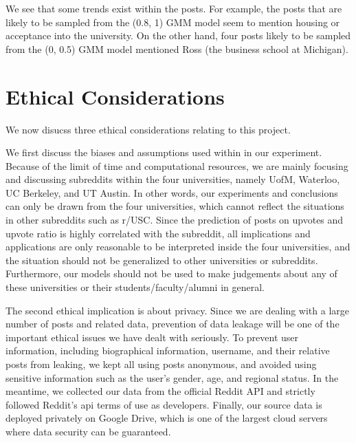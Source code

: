 \documentclass[11pt,a4paper]{article}
\let\Oldsection\section
\renewcommand{\section}{\FloatBarrier\Oldsection}
\begin{document}
    We see that some trends exist within the posts. For example, the posts that are likely to be sampled from the (0.8, 1) GMM model seem to mention housing or acceptance into the university. On the other hand, four posts likely to be sampled from the (0, 0.5) GMM model mentioned Ross (the business school at Michigan).
    
    
\Oldsection{Ethical Considerations}
\label{sec:ethics}
    We now disucss three ethical considerations relating to this project.

    We first discuss the biases and assumptions used within in our experiment. Because of the limit of time and computational resources, we are mainly focusing and discussing subreddits within the four universities, namely UofM, Waterloo, UC Berkeley, and UT Austin. In other words, our experiments and conclusions can only be drawn from the four universities, which cannot reflect the situations in other subreddits such as r/USC. Since the prediction of posts on upvotes and upvote ratio is highly correlated with the subreddit, all implications and applications are only reasonable to be interpreted inside the four universities, and the situation should not be generalized to other universities or subreddits. Furthermore, our models should not be used to make judgements about any of these universities or their students/faculty/alumni in general.

    The second ethical implication is about privacy. Since we are dealing with a large number of posts and related data, prevention of data leakage will be one of the important ethical issues we have dealt with seriously. To prevent user information, including biographical information, username, and their relative posts from leaking, we kept all using posts anonymous, and avoided using sensitive information such as the user's gender, age, and regional status. In the meantime, we collected our data from the official Reddit API and strictly followed Reddit’s api terms of use as developers. Finally, our source data is deployed privately on Google Drive, which is one of the largest cloud servers where data security can be guaranteed.
    
\end{document}
